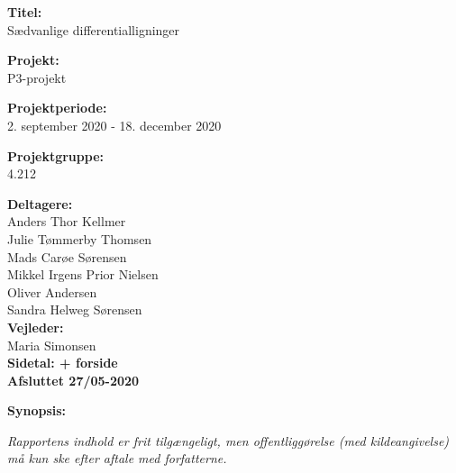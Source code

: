 \begin{minipage}[t]{0.48\textwidth}
\textbf{Titel:} \\[5pt]\hspace{2ex}
{Sædvanlige differentialligninger}
\bigskip

\textbf{Projekt:} \\[5pt]\hspace{2ex}
P3-projekt
\bigskip

\textbf{Projektperiode:} \\[5pt]\hspace{2ex}
2. september 2020 - 18. december 2020
\bigskip

\textbf{Projektgruppe:} \\[5pt]\hspace{2ex}
4.212
\bigskip

\textbf{Deltagere:} \\[5pt]%
Anders Thor Kellmer\\%
Julie Tømmerby Thomsen\\%
Mads Carøe Sørensen\\%
Mikkel Irgens Prior Nielsen\\%
Oliver Andersen \\
Sandra Helweg Sørensen\\%

\textbf{Vejleder:} \\[5pt]%
Maria Simonsen \\

\textbf{Sidetal: \pageref{LastPage} + forside} \\ 
\textbf{Afsluttet 27/05-2020}

\end{minipage}
\hfill
\begin{minipage}[t]{0.5\textwidth}
\textbf{Synopsis:} \\[5pt]

\end{minipage}
\hspace*{2ex}

\vfill

{\footnotesize \textit{Rapportens indhold er frit tilgængeligt, men offentliggørelse (med kildeangivelse) må kun ske efter aftale med forfatterne.}}

\pagebreak
\phantom{a}
\thispagestyle{empty}